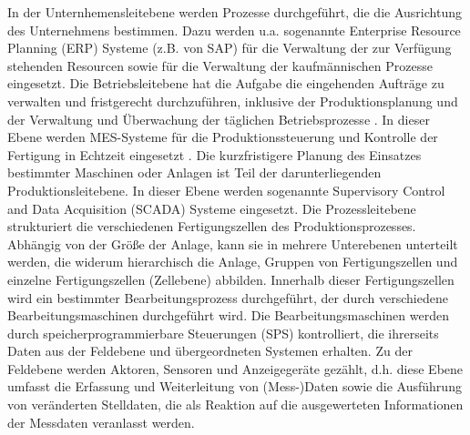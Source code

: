 In der Unternhemensleitebene werden Prozesse durchgeführt, die die Ausrichtung des Unternehmens bestimmen. Dazu werden u.a. sogenannte Enterprise Resource Planning (ERP) Systeme (z.B. von SAP) für die Verwaltung der zur Verfügung stehenden Resourcen sowie für die Verwaltung der kaufmännischen Prozesse eingesetzt.
Die Betriebsleitebene hat die Aufgabe die eingehenden Aufträge zu verwalten und fristgerecht durchzuführen, inklusive der Produktionsplanung und der Verwaltung und Überwachung der täglichen Betriebsprozesse \citep{Linke2017}. In dieser Ebene werden MES-Systeme für die Produktionssteuerung und Kontrolle der Fertigung in Echtzeit eingesetzt \cite{MES1}. %
Die kurzfristigere Planung des Einsatzes bestimmter Maschinen oder Anlagen ist Teil der darunterliegenden Produktionsleitebene. In dieser Ebene werden sogenannte Supervisory Control and Data Acquisition (SCADA) Systeme eingesetzt. 
Die Prozessleitebene strukturiert die verschiedenen Fertigungszellen des Produktionsprozesses. Abhängig von der Größe der Anlage, kann sie in mehrere Unterebenen unterteilt werden, die widerum hierarchisch die Anlage, Gruppen von Fertigungszellen und einzelne Fertigungszellen (Zellebene) abbilden. Innerhalb dieser Fertigungszellen wird ein bestimmter Bearbeitungsprozess durchgeführt, der durch verschiedene Bearbeitungsmaschinen durchgeführt wird. Die Bearbeitungsmaschinen werden durch speicherprogrammierbare Steuerungen (SPS) kontrolliert, die ihrerseits Daten aus der Feldebene und übergeordneten Systemen erhalten.
Zu der Feldebene werden Aktoren, Sensoren und Anzeigegeräte gezählt, d.h. diese Ebene umfasst die Erfassung und Weiterleitung von (Mess-)Daten sowie die Ausführung von veränderten Stelldaten, die als Reaktion auf die ausgewerteten Informationen der Messdaten veranlasst werden\citep{Linke2017}.

